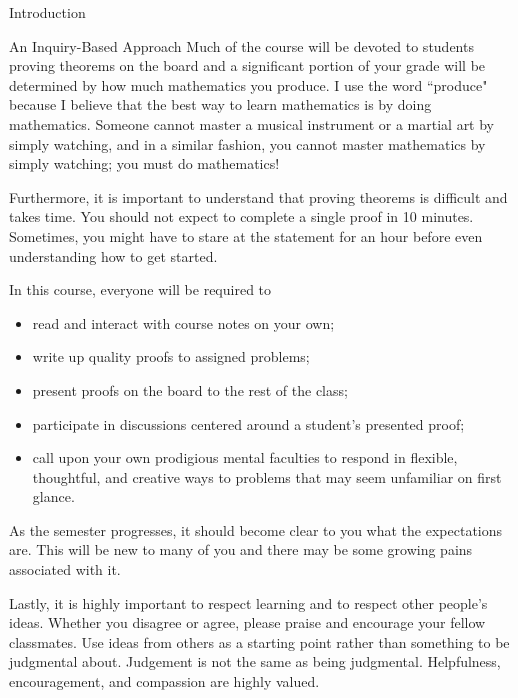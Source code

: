 \begin{chapter}{Introduction}
\begin{section}{An Inquiry-Based Approach}
Much of the course will be devoted to students proving theorems on the board and a significant portion of your grade will be determined by how much mathematics you produce. I use the word ``produce" because I believe that the best way to learn mathematics is by doing mathematics. Someone cannot master a musical instrument or a martial art by simply watching, and in a similar fashion, you cannot master mathematics by simply watching; you must do mathematics!

Furthermore, it is important to understand that proving theorems is difficult and takes time. You should not expect to complete a single proof in 10 minutes. Sometimes, you might have to stare at the statement for an hour before even understanding how to get started. 

In this course, everyone will be required to
\begin{itemize}
\item read and interact with course notes on your own;
\item write up quality proofs to assigned problems;
\item present proofs on the board to the rest of the class;
\item participate in discussions centered around a student's presented proof;
\item call upon your own prodigious mental faculties to respond in flexible, thoughtful, and creative ways to problems that may seem unfamiliar on first glance.
\end{itemize}
\noindent As the semester progresses, it should become clear to you what the expectations are. This will be new to many of you and there may be some growing pains associated with it.

Lastly, it is highly important to respect learning and to respect other people's ideas.  Whether you disagree or agree, please praise and encourage your fellow classmates.  Use ideas from others as a starting point rather than something to be judgmental about.  Judgement is not the same as being judgmental.  Helpfulness, encouragement, and compassion are highly valued.

\end{section}


\end{chapter}
